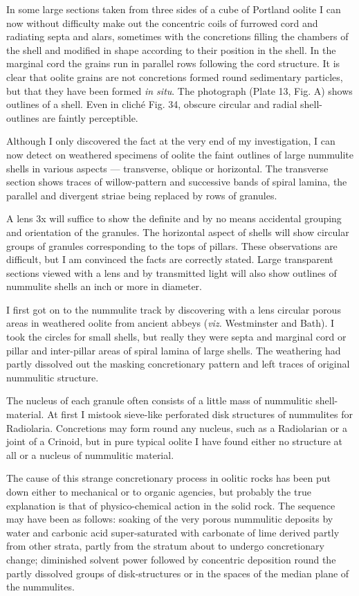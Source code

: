 \documentclass[a4paper, 12pt, oneside]{article}
\begin{document}
In some large sections taken from three sides of a cube of Portland oolite I can now without difficulty make out the concentric coils of furrowed cord and radiating septa and alars, sometimes with the concretions filling the chambers of the shell and modified in shape according to their position in the shell. In the marginal cord the grains run in parallel rows following the cord structure. It is clear that oolite grains are not concretions formed round sedimentary particles, but that they have been formed \emph{in situ}. The photograph (Plate 13, Fig. A) shows outlines of a shell. Even in cliché Fig. 34, obscure circular and radial shell-outlines are faintly perceptible.

Although I only discovered the fact at the very end of my investigation, I can now detect on weathered specimens of oolite the faint outlines of large nummulite shells in various aspects --- transverse, oblique or horizontal. The transverse section shows traces of willow-pattern and successive bands of spiral lamina, the parallel and divergent striae being replaced by rows of granules.

A lens 3x will suffice to show the definite and by no means accidental grouping and orientation of the granules. The horizontal aspect of shells will show circular groups of granules corresponding to the tops of pillars. These observations are difficult, but I am convinced the facts are correctly stated. Large transparent sections viewed with a lens and by transmitted light will also show outlines of nummulite shells an inch or more in diameter.

I first got on to the nummulite track by discovering with a lens circular porous areas in weathered oolite from ancient abbeys (\emph{viz.} Westminster and Bath). I took the circles for small shells, but really they were septa and marginal cord or pillar and inter-pillar areas of spiral lamina of large shells. The weathering had partly dissolved out the masking concretionary pattern and left traces of original nummulitic structure.

The nucleus of each granule often consists of a little mass of nummulitic shell-material. At first I mistook sieve-like perforated disk structures of nummulites for Radiolaria. Concretions may form round any nucleus, such as a Radiolarian or a joint of a Crinoid, but in pure typical oolite I have found either no structure at all or a nucleus of nummulitic material.

The cause of this strange concretionary process in oolitic rocks has been put down either to mechanical or to organic agencies, but probably the true explanation is that of physico-chemical action in the solid rock. The sequence may have been as follows: soaking of the very porous nummulitic deposits by water and carbonic acid super-saturated with carbonate of lime derived partly from other strata, partly from the stratum about to undergo concretionary change; diminished solvent power followed by concentric deposition round the partly dissolved groups of disk-structures or in the spaces of the median plane of the nummulites.
\end{document}

